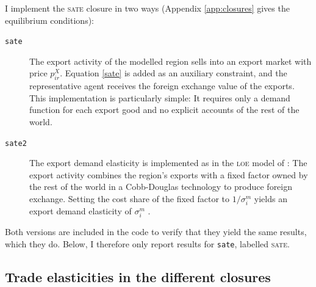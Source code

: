 \documentclass{jgea}
\newcommand{\LOE}{\textsc{loe}\xspace}
\newcommand{\SATE}{\textsc{sate}\xspace}
\newcommand{\IOT}{\textsc{iot}\xspace}
\newcommand{\SAM}{\textsc{sam}\xspace}
\newcommand{\GTAP}{\textsc{gtap}\xspace}
\begin{document}
I implement the \SATE closure in two ways (Appendix \ref{app:closures} gives the equilibrium conditions):
\begin{description}
\item[\texttt{sate}] The export activity of the modelled region sells into an export market with price $p^X_{ir}$.
Equation \eqref{sate} is added as an auxiliary constraint, and the representative agent receives the foreign exchange value of the exports.
This implementation is particularly simple: It requires only a demand function for each export good and no explicit accounts of the rest of the world.
\item[\texttt{sate2}] The export demand elasticity is implemented as in the \LOE model of \citet{Schreiber2024}: The export activity combines the region's exports with a fixed factor owned by the rest of the world in a Cobb-Douglas technology to produce foreign exchange.
Setting the cost share of the fixed factor to $1/\sigma^m_i$ yields an export demand elasticity of $\sigma^m_i$ \citep[Proposition 2]{Schreiber2024}.
\end{description}
Both versions are included in the code to verify that they yield the same results, which they do.
Below, I therefore only report results for \texttt{sate}, labelled \SATE.

\subsection{Trade elasticities in the different closures}\label{sec:elasticities}
\end{document}
